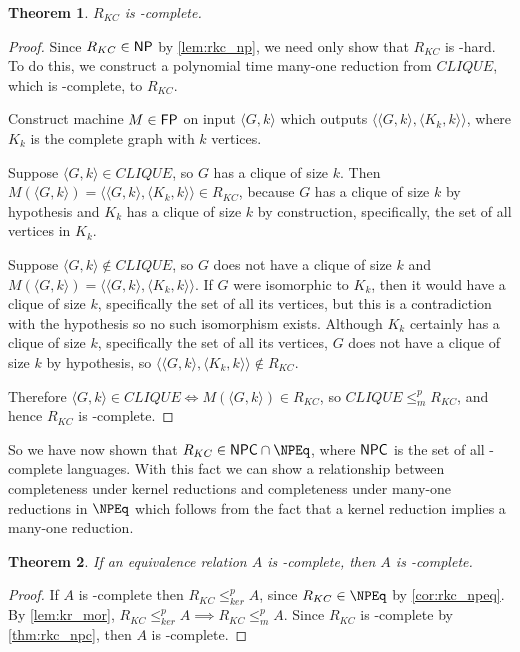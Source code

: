 \documentclass{article}
\newtheorem{theorem}{Theorem}[section]
\theoremstyle{definition} \newtheorem{definition}[definition]{Definition}
\newcommand{\kr}{\leq^{p}_{ker}} %
\newcommand{\mor}{\leq^{p}_{m}} %
\newcommand{\pair}[2]{\langle#1,#2\rangle} %
\begin{document}
\begin{theorem}\label{thm:rkc_npc}$R_{KC}$ is \NP-complete.\end{theorem}
\begin{proof}
  Since $R_{KC}\in{\ensuremath{\mathsf{NP}}}$ by \autoref{lem:rkc_np}, we need only show that $R_{KC}$
  is \NP-hard. To do this, we construct a polynomial time many-one reduction
  from $CLIQUE$, which is \NP-complete, to $R_{KC}$.

  Construct machine $M\in{\ensuremath{\mathsf{FP}}}$ on input $\pair{G}{k}$ which outputs
  $\pair{\pair{G}{k}}{\pair{K_k}{k}}$, where $K_k$ is the complete graph with
  $k$ vertices.

  Suppose $\pair{G}{k}\in CLIQUE$, so $G$ has a clique of size $k$. Then
  $M(\pair{G}{k})=\pair{\pair{G}{k}}{\pair{K_k}{k}}\in R_{KC}$, because $G$ has
  a clique of size $k$ by hypothesis and $K_k$ has a clique of size $k$ by
  construction, specifically, the set of all vertices in $K_k$.
  
  Suppose $\pair{G}{k}\notin CLIQUE$, so $G$ does not have a clique of size $k$
  and $M(\pair{G}{k})=\pair{\pair{G}{k}}{\pair{K_k}{k}}$. If $G$ were
  isomorphic to $K_k$, then it would have a clique of size $k$, specifically
  the set of all its vertices, but this is a contradiction with the hypothesis
  so no such isomorphism exists. Although $K_k$ certainly has a clique of size
  $k$, specifically the set of all its vertices, $G$ does not have a clique of
  size $k$ by hypothesis, so $\pair{\pair{G}{k}}{\pair{K_k}{k}}\notin R_{KC}$.
  
  Therefore $\pair{G}{k}\in CLIQUE\iff M(\pair{G}{k})\in R_{KC}$, so $CLIQUE\mor R_{KC}$,
  and hence $R_{KC}$ is \NP-complete.
\end{proof}

So we have now shown that $R_{KC}\in\NPC\cap\NPEq$, where ${\mathsf{NPC}}$ is the set of
all \NP-complete languages. With this fact we can show a relationship between
completeness under kernel reductions and completeness under many-one reductions
in $\NPEq$ which follows from the fact that a kernel reduction implies a
many-one reduction.

\begin{theorem}\label{thm:npeqc_npc}If an equivalence relation $A$ is
  \NPEq-complete, then $A$ is \NP-complete.\end{theorem}
\begin{proof}
  If $A$ is \NPEq-complete then $R_{KC}\kr A$, since $R_{KC}\in\NPEq$ by
  \autoref{cor:rkc_npeq}. By \autoref{lem:kr_mor}, $R_{KC}\kr A\implies
  R_{KC}\mor A$. Since $R_{KC}$ is \NP-complete by \autoref{thm:rkc_npc}, then
  $A$ is \NP-complete.
\end{proof}
\end{document}
